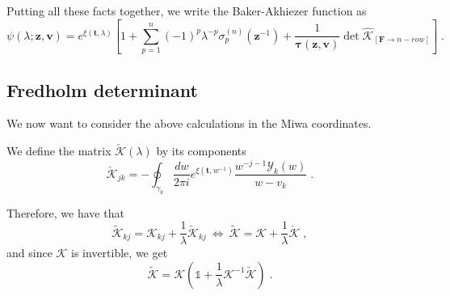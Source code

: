 \documentclass[a4paper,12pt]{amsart}
\begin{document}
Putting all these facts together, we write the Baker-Akhiezer function
as 
\begin{equation}
  \psi(\lambda; \bm{z}, \bm{v}) =
  e^{\xi(\bm{t}, \lambda)}  \left[ 1 + 
  \sum_{p=1}^n (-1)^p \lambda^{-p} \sigma_p^{(n)}(\bm{z}^{-1})
    + \frac{1}{\bm{\tau}(\bm{z}, \bm{v})}
    \det \widehat{\mathcal{K}}_{[\bm{F} \to n-row]}
  \right]\; .
\end{equation}



%



\subsection{Fredholm determinant}

We now want to consider the above calculations in the Miwa
coordinates. 

We define the matrix \(\check{\mathcal{K}}(\lambda)\) by its components
\begin{equation}
    \check{\mathcal{K}}_{jk}  = -  
    \oint_{\gamma_k} \frac{dw}{2\pi i}
    e^{\xi(\bm{t}, w^{- 1})} \frac{w^{-j -1 }\mathcal{Y}_k(w)}{w - v_k} \; .
\end{equation}

Therefore, we have that 
\begin{equation}
  \widetilde{\mathcal{K}}_{kj} = 
  \mathcal{K}_{kj}  + \frac{1}{\lambda}
  \check{\mathcal{K}}_{kj}
  \ \Leftrightarrow \
  \widetilde{\mathcal{K}} = 
  \mathcal{K}  + \frac{1}{\lambda}
  \check{\mathcal{K}}\; , 
\end{equation}
and since \(\mathcal{K}\) is invertible, we get
\begin{equation}
  \widetilde{\mathcal{K}} = 
  \mathcal{K}\left( \mathbb{1}  +
  \frac{1}{\lambda}\mathcal{K}^{-1}\check{\mathcal{K}} \right)\; .
\end{equation}
\end{document}
